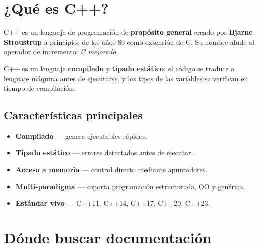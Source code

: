 \documentclass[12pt, oneside]{article}
\begin{document}

\tableofcontents
\newpage

\section{¿Qué es C++?}

C++ es un lenguaje de programación de \textbf{propósito general} creado por
\textbf{Bjarne Stroustrup} a principios de los años 80 como extensión de C.
Su nombre alude al operador de incremento: \textit{C mejorado}.

\begin{recuerda}
  C++ es un lenguaje \textbf{compilado} y \textbf{tipado estático}: el código
  se traduce a lenguaje máquina antes de ejecutarse, y los tipos de las variables
  se verifican en tiempo de compilación.
\end{recuerda}

\subsection{Características principales}

\begin{itemize}
  \item \textbf{Compilado} — genera ejecutables rápidos.
  \item \textbf{Tipado estático} — errores detectados antes de ejecutar.
  \item \textbf{Acceso a memoria} — control directo mediante apuntadores.
  \item \textbf{Multi-paradigma} — soporta programación estructurada, OO y genérica.
  \item \textbf{Estándar vivo} — C++11, C++14, C++17, C++20, C++23.
\end{itemize}

\section{Dónde buscar documentación}
\end{document}
